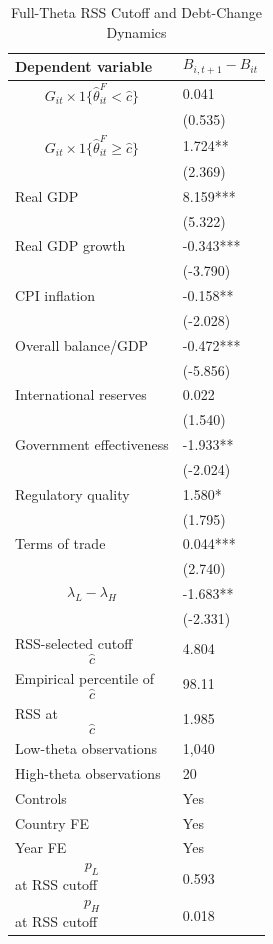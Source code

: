 \begin{table}[H]\centering
\begin{threeparttable}
\caption{Full-Theta RSS Cutoff and Debt-Change Dynamics}
\label{tab:deltaB_rss_cutoff_fulltheta}
\scriptsize
\begin{tabularx}{\textwidth}{lY}
\toprule
Dependent variable & $$B_{i,t+1}-B_{it}$$ \\
\midrule
$$G_{it}\times 1\{\widehat{\theta}^{F}_{it}<\widehat{c}\}$$ & 0.041 \\
 & (0.535) \\
$$G_{it}\times 1\{\widehat{\theta}^{F}_{it}\geq\widehat{c}\}$$ & 1.724** \\
 & (2.369) \\
Real GDP & 8.159*** \\
 & (5.322) \\
Real GDP growth & -0.343*** \\
 & (-3.790) \\
CPI inflation & -0.158** \\
 & (-2.028) \\
Overall balance/GDP & -0.472*** \\
 & (-5.856) \\
International reserves & 0.022 \\
 & (1.540) \\
Government effectiveness & -1.933** \\
 & (-2.024) \\
Regulatory quality & 1.580* \\
 & (1.795) \\
Terms of trade & 0.044*** \\
 & (2.740) \\
$$\lambda_L-\lambda_H$$ & -1.683** \\
 & (-2.331) \\
\midrule
RSS-selected cutoff $$\widehat{c}$$ & 4.804 \\
Empirical percentile of $$\widehat{c}$$ & 98.11 \\
RSS at $$\widehat{c}$$ & 1.985 \\
Low-theta observations & 1,040 \\
High-theta observations & 20 \\
Controls & Yes \\
Country FE & Yes \\
Year FE & Yes \\
$$p_L$$ at RSS cutoff & 0.593 \\
$$p_H$$ at RSS cutoff & 0.018 \\

\end{tabularx}
\end{threeparttable}
\end{table}
